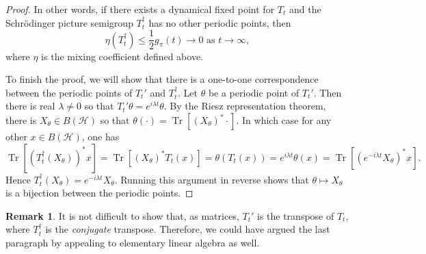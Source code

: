 \documentclass{article}
\DeclareMathOperator{\Tr}{Tr}
\newcommand{\<}{\langle}
\renewcommand{\>}{\rangle}
\numberwithin{equation}{section}
\theoremstyle{definition}
\newtheorem{rmk}[thm]{Remark}
\begin{document}
\begin{proof}
In other words, if there exists a dynamical fixed point for $T_t$ and the Schr\"odinger picture semigroup $T^\dagger _t$ has no other periodic points, then \[ \eta(T_t^\dagger) \le \frac{1}{2} g_\pi(t) \to 0 \text{ as }t\to \infty,\] where $\eta$ is the mixing coefficient defined above. 

To finish the proof, we will show that there is a one-to-one correspondence between the periodic points of $T_t'$ and $T_t^\dagger$. Let $\theta$ be a periodic point of $T_t'$. Then there is real $\lambda \neq 0$ so that $T_t'\theta = e^{i\lambda t}\theta$. By the Riesz representation theorem, there is $X_\theta \in B(\mathcal{H})$ so that $\theta(\cdot) = \Tr[(X_\theta)^* \cdot ]$. In which case for any other $x\in B(\mathcal{H})$, one has 
	\[
		\Tr[(T^\dagger_t(X_\theta))^*x] = \Tr[(X_\theta)^* T_t(x)] = \theta(T_t(x)) = e^{i\lambda t} \theta(x) = \Tr[(e^{-i\lambda t} X_\theta)^* x]. \] Hence $T^\dagger_t(X_\theta) = e^{-i \lambda t} X_\theta$. Running this argument in reverse shows that $\theta \mapsto X_\theta$ is a bijection between the periodic points. 
	\end{proof}
	
	\begin{rmk}
		It is not difficult to show that, as matrices, $T_t'$ is the transpose of $T_t$, where $T_t^\dagger$ is the \textit{conjugate} transpose. Therefore, we could have argued the last paragraph by appealing to elementary linear algebra as well. 
	\end{rmk}



\end{document}
